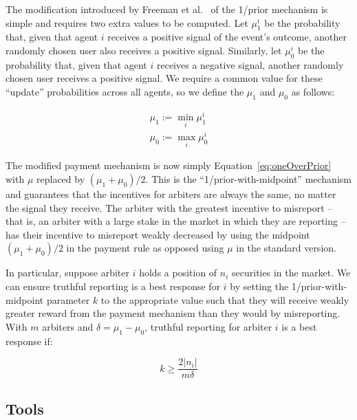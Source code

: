 The modification introduced by Freeman et al.~\cite{Freeman2017} of the 1/prior
mechanism is simple and requires two extra values to be computed. Let $\mu_1^i$
be the probability that, given that agent $i$ receives a positive signal of the
event's outcome, another randomly chosen user also receives a positive signal.
Similarly, let $\mu_0^i$ be the probability that, given that agent $i$ receives
a negative signal, another randomly chosen user receives a positive signal. We
require a common value for these ``update'' probabilities across all agents, so
we define the $\mu_1$ and $\mu_0$ as follows:

\begin{equation}
	\begin{gathered}
		\mu_1 := \min_i \mu_1^i \\
		\mu_0 := \max_i \mu_0^i
	\end{gathered}
\end{equation}

The modified payment mechanism is now simply Equation~\ref{eq:oneOverPrior}
with $\mu$ replaced by $(\mu_1 + \mu_0)/2$. This is the
``1/prior-with-midpoint'' mechanism and guarantees that the incentives for
arbiters are always the same, no matter the signal they receive. The arbiter
with the greatest incentive to misreport -- that is, an arbiter with a large
stake in the market in which they are reporting -- has their incentive to
misreport weakly decreased by using the midpoint $(\mu_1 + \mu_0)/2$ in the
payment rule as opposed using $\mu$ in the standard version.

In particular, suppose arbiter $i$ holds a position of $n_i$ securities in the
market. We can ensure truthful reporting is a best response for $i$ by setting
the 1/prior-with-midpoint parameter $k$ to the appropriate value such that they
will receive weakly greater reward from the payment mechanism than they would
by misreporting. With $m$ arbiters and $\delta = \mu_1 - \mu_0$, truthful
reporting for arbiter $i$ is a best response if:

\begin{equation}
	\label{eq:kParameter}
	k \ge \frac{2 |n_i|}{m \delta}
\end{equation}

\subsection{Tools}


